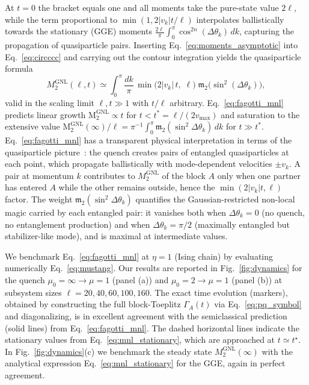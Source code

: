 \documentclass[prx,twocolumn,superscriptaddress,aps,10pt, frontmatterverbose, reprint,footinbib,longbibliography=true]{revtex4-2}
\newcommand{\NL}{\mathrm{GNL}}
\newcommand{\MNL}{\mathrm{M}_2^{\NL}}
\providecommand{\DIFaddtex}[1]{{\protect\color{red}#1}} %
\providecommand{\DIFaddbegin}{\protect\color{red}} %
\providecommand{\DIFaddend}{\protect\color{black}} %
\providecommand{\DIFaddtex}[1]{\texorpdfstring{\DIFaddtex{#1}}{#1}} %
\providecommand{\DIFadd}[1]{\texorpdfstring{\DIFaddtex{#1}}{#1}} %
\newcommand{\DIFaddincludegraphics}[2][]{{\color{blue}\fbox{\DIFOincludegraphics[#1]{#2}}}} %
\DeclareRobustCommand{\DIFaddbegin}{\DIFOaddbegin \let\includegraphics\DIFaddincludegraphics} %
\DeclareRobustCommand{\DIFaddend}{\DIFOaddend \let\includegraphics\DIFOincludegraphics} %
\begin{document}
At $t=0$ the bracket equals one and all moments take the pure-state value $2\ell$, while the term proportional to $\min(1,2|v_k|t/\ell)$ interpolates ballistically towards  the stationary (GGE) moments $\frac{2\ell}{\pi}\int_0^\pi\cos^{2n}(\Delta\theta_k)\,dk$, capturing the propagation of quasiparticle pairs.
Inserting Eq.~\eqref{eq:moments_asymptotic} into  Eq.~\eqref{eq:circccc} and carrying out the contour integration yields the quasiparticle formula
\begin{equation}
    M_2^{\mathrm{GNL}}(\ell,t) \simeq \int_0^\pi\!\frac{dk}{\pi}\,\min\!\bigl(2|v_k|\,t,\;\ell\bigr)\;\mathfrak{m}_2\!\bigl(\sin^2(\Delta\theta_k)\bigr),
    \label{eq:fagotti_mnl}
\end{equation}
valid in the scaling limit $\ell, t \gg 1$ with $t/\ell$ arbitrary.
Eq.~\eqref{eq:fagotti_mnl} predicts linear growth $\MNL \propto t$ for $t < t^* = \ell/(2v_{\max})$ and saturation to the extensive value $\MNL(\infty)/\ell = \pi^{-1}\int_0^\pi \mathfrak{m}_2(\sin^2\!\Delta\theta_k)\, dk$ for $t \gg t^*$.
Eq.~\eqref{eq:fagotti_mnl} has a transparent physical interpretation in terms of the quasiparticle picture~\cite{Calabrese2005evolution,Fagotti2008}: the quench creates pairs of entangled quasiparticles at each point, which propagate ballistically with mode-dependent velocities $\pm v_k$.
A pair at momentum $k$ contributes to $M_2^{\mathrm{GNL}}$ of the block $A$ only when one partner has entered $A$ while the other remains outside, hence the $\min(2|v_k|t,\ell)$ factor.
The weight $\mathfrak{m}_2(\sin^2\Delta\theta_k)$  quantifies the Gaussian-restricted non-local magic carried by each entangled pair: it vanishes both when $\Delta\theta_k = 0$ (no quench, no entanglement production) and when $\Delta\theta_k = \pi/2$ (maximally entangled but stabilizer-like mode), and is maximal at intermediate values.

We benchmark Eq.~\eqref{eq:fagotti_mnl} at $\eta=1$ (Ising chain) by  evaluating numerically Eq.~\eqref{eq:mustang}. 
Our results are reported in Fig.~\ref{fig:dynamics} for the quench $\mu_0 = \infty \to \mu = 1$ (panel (a))  and $\mu_0 = 2 \to \mu = 1$ (panel (b)) at subsystem sizes \DIFaddbegin \DIFadd{$\ell = 20, 40, 60, 100, 160$}\DIFaddend . 
The exact time evolution (markers), obtained by constructing the full block-Toeplitz $\Gamma_A(t)$ via Eq.~\eqref{eq:pq_symbol} and diagonalizing, is in excellent agreement with the semiclassical prediction (solid lines) from Eq.~\eqref{eq:fagotti_mnl}.
The dashed horizontal lines indicate the stationary values from Eq.~\eqref{eq:mnl_stationary}, which are approached at $t \simeq t^\star$.
In Fig.~\ref{fig:dynamics}(c) we benchmark the steady state $M_2^{\mathrm{GNL}}(\infty)$ with the analytical expression Eq.~\eqref{eq:mnl_stationary} for the GGE, again in perfect agreement. 
\end{document}
